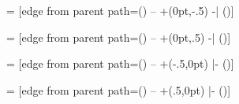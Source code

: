 \def\tikz@grow@circle@from{%
  \pgftransformshift{\pgfpointpolar{\tikz@grow@circle@from@start+(\pgfkeysvalueof{/tikz/sibling angle})*(\tikznumberofcurrentchild-1)}{\the\tikzleveldistance}}%
}


\def\tikz@grow@circle@from@{%
  \pgftransformshift{\pgfpointpolar{\tikz@grow@circle@from@start-(\pgfkeysvalueof{/tikz/sibling angle})*(\tikznumberofcurrentchild-1)}{\the\tikzleveldistance}}%
}







%
%

=
  [edge from parent path={(\tikzparentnode\tikzparentanchor) -- +(0pt,-.5\tikzleveldistance)  -| (\tikzchildnode\tikzchildanchor)}]

=
  [edge from parent path={(\tikzparentnode\tikzparentanchor) -- +(0pt,.5\tikzleveldistance)  -| (\tikzchildnode\tikzchildanchor)}]

=
  [edge from parent path={(\tikzparentnode\tikzparentanchor) -- +(-.5\tikzleveldistance,0pt) |- (\tikzchildnode\tikzchildanchor)}]

=
  [edge from parent path={(\tikzparentnode\tikzparentanchor) -- +(.5\tikzleveldistance,0pt) |- (\tikzchildnode\tikzchildanchor)}]


                                    
\endinput
